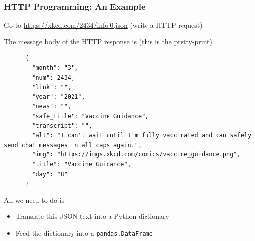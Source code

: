 \documentclass[10pt, aspectratio=1610, natbib, handout]{beamer}
\begin{document}
  \begin{frame}[fragile]
    \frametitle{HTTP Programming: An Example}

    Go to \url{https://xkcd.com/2434/info.0.json} (write a HTTP request)

    \vfill\pause

    The message body of the HTTP response is (this is the pretty-print)

    \begin{lstlisting}
      {
        "month": "3",
        "num": 2434,
        "link": "",
        "year": "2021",
        "news": "",
        "safe_title": "Vaccine Guidance",
        "transcript": "",
        "alt": "I can't wait until I'm fully vaccinated and can safely send chat messages in all caps again.",
        "img": "https://imgs.xkcd.com/comics/vaccine_guidance.png",
        "title": "Vaccine Guidance",
        "day": "8"
      }
    \end{lstlisting}

    \vfill\pause

    All we need to do is
    \begin{itemize}
      \item Translate this JSON text into a Python dictionary
      \item Feed the dictionary into a \texttt{pandas.DataFrame}
    \end{itemize}

    \vfill


  \end{frame}
\end{document}
